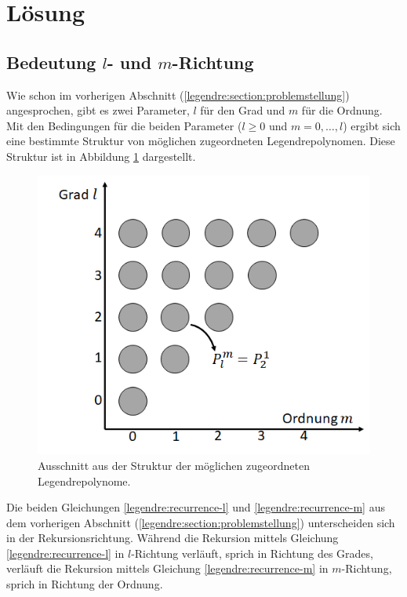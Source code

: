 %
%
%
\section{Lösung
\label{legendre:section:loesung}}
\subsection{Bedeutung $l$- und $m$-Richtung
\label{legendre:subsection:lmrichtung}}
Wie schon im vorherigen Abschnitt (\ref{legendre:section:problemstellung}) angesprochen, gibt es zwei Parameter, $l$ für den Grad und $m$ für die Ordnung.
Mit den Bedingungen für die beiden Parameter ($l\geq 0$ und $m=0, \ldots , l$) ergibt sich eine bestimmte Struktur von möglichen zugeordneten Legendrepolynomen.
Diese Struktur ist in Abbildung \ref{legendre:fig:struktur} dargestellt.
\begin{figure}[!h]
\centering
\includegraphics[width=0.6\linewidth]{papers/legendre/plots/legendre_struktur}
\caption{Ausschnitt aus der Struktur der möglichen zugeordneten Legendrepolynome.}
\label{legendre:fig:struktur}
\end{figure}
Die beiden Gleichungen \eqref{legendre:recurrence-l} und \eqref{legendre:recurrence-m} aus dem vorherigen Abschnitt (\ref{legendre:section:problemstellung}) unterscheiden sich in der Rekursionsrichtung.
Während die Rekursion mittels Gleichung \eqref{legendre:recurrence-l} in $l$-Richtung verläuft, sprich in Richtung des Grades, verläuft die Rekursion mittels Gleichung \eqref{legendre:recurrence-m} in $m$-Richtung, sprich in Richtung der Ordnung.

